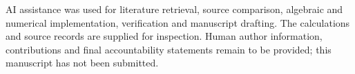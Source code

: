 \documentclass[pdflatex,iicol,sn-mathphys-num]{sn-jnl}
\begin{document}
AI assistance was used for literature retrieval, source comparison, algebraic and numerical implementation, verification and manuscript drafting. The calculations and source records are supplied for inspection. Human author information, contributions and final accountability statements remain to be provided; this manuscript has not been submitted.


\end{document}

